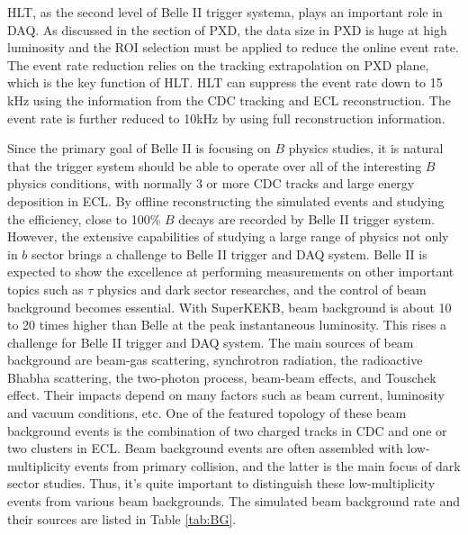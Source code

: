 HLT, as the second level of Belle II trigger systema, plays an important role in DAQ. As discussed in the section of PXD, the data size in PXD is huge at high luminosity and the ROI selection must be applied to reduce the online event rate. The event rate reduction relies on the tracking extrapolation on PXD plane, which is the key function of HLT. HLT can suppress the event rate down to 15 kHz using the information from the CDC tracking and ECL reconstruction. The event rate is further reduced to 10kHz by using full reconstruction information. 

Since the primary goal of Belle II is focusing on $B$ physics studies, it is natural that the trigger system should be able to operate over all of the interesting $B$ physics conditions, with normally 3 or more CDC tracks and large energy deposition in ECL. By offline reconstructing the simulated events and studying the efficiency, close to 100\% $B$ decays are recorded by Belle II trigger system. However, the extensive capabilities of studying a large range of physics not only in $b$ sector brings a challenge to Belle II trigger and DAQ system. Belle II is expected to show the excellence at performing measurements on other important topics such as $\tau$ physics and dark sector researches, and the control of beam background becomes essential.
With SuperKEKB, beam background is about 10 to 20 times higher than Belle at the peak instantaneous luminosity. This rises a challenge for Belle II trigger and DAQ system. The main sources of beam background are beam-gas scattering, synchrotron radiation, the radioactive Bhabha scattering, the two-photon process, beam-beam effects, and Touschek effect. Their impacts depend on many factors such as beam current, luminosity and vacuum conditions, etc. One of the featured topology of these beam background events is the combination of two charged tracks in CDC and one or two clusters in ECL. Beam background events are often assembled with low-multiplicity events from primary collision, and the latter is the main focus of dark sector studies. Thus, it's quite important to distinguish these low-multiplicity events from various beam backgrounds. The simulated beam background rate and their sources are listed in Table \ref{tab:BG}.

